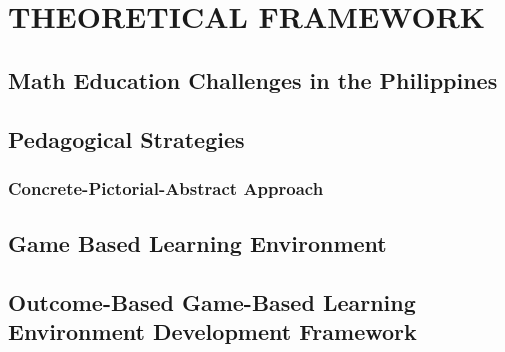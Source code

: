 \chapter{THEORETICAL FRAMEWORK}

\section{Math Education Challenges in the Philippines}



\section{Pedagogical Strategies}

\subsection{Concrete-Pictorial-Abstract Approach}



\section{Game Based Learning Environment}



\section{Outcome-Based Game-Based Learning Environment Development Framework}

